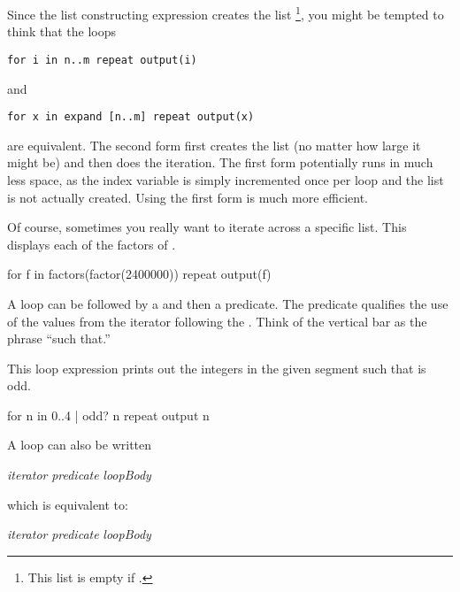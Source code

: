 {Since the list constructing expression 
creates the list
\spad{[n, n+1, ..., m]}\footnote{This list is empty if .},
 you might be tempted to think that the loops
\begin{verbatim}
for i in n..m repeat output(i)
\end{verbatim}
and
\begin{verbatim}
for x in expand [n..m] repeat output(x)
\end{verbatim}
are equivalent.
The second form first creates the list
 (no matter how large it might be) and
then does the iteration.
The first form potentially runs in much less space, as the index variable
 is simply incremented once per loop and the list is not actually
created.
Using the first form is much more efficient.
%
\begin{xtc}
\begin{xtccomment}
Of course, sometimes you really want to iterate across a specific list.
This displays each of the factors of .
\end{xtccomment}
\begin{spadsrc}
for f in factors(factor(2400000)) repeat output(f)
\end{spadsrc}
\end{xtc}


A  loop can be followed by a \spadSyntax{|} and then a
predicate.
The predicate qualifies the use of the values from the iterator following
the .
Think of the vertical bar
\spadSyntax{|} as the phrase ``such that.''
\begin{xtc}
\begin{xtccomment}
This loop expression
prints out the integers  in the given segment
such that  is odd.
\end{xtccomment}
\begin{spadsrc}
for n in 0..4 | odd? n repeat output n
\end{spadsrc}
\end{xtc}

\beginImportant
A  loop can also be written
\begin{center}
 {\it iterator} \spad{|} {\it predicate}   {\it loopBody}
\end{center}
which is equivalent to:
\begin{center}
 {\it iterator} 
{\it predicate}  {\it loopBody}  
\end{center}
\endImportant

}

